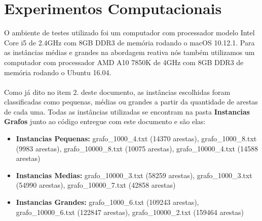 \documentclass[a4paper, 12pt]{article}
\begin{document}
\section{Experimentos Computacionais}

O ambiente de testes utilizado foi um computador com processador modelo Intel Core i5 de 2.4GHz com 8GB DDR3 de memória rodando o macOS 10.12.1. Para as instâncias médias e grandes na abordagem reativa nós também utilizamos um computador
com processador AMD A10 7850K de 4GHz com 8GB DDR3 de memória rodando o Ubuntu 16.04.
\\ \\ \indent Como já dito no item 2. deste documento, as instâncias escolhidas foram classificadas como pequenas, médias ou grandes
a partir da quantidade de arestas de cada uma. Todas as instâncias utilizadas se encontram na pasta \textbf{Instancias Grafos} junto ao código entregue com este documento e são elas:

\begin{itemize}
  \item \textbf{Instancias Pequenas:} grafo\_1000\_4.txt (14370 arestas), grafo\_1000\_8.txt (9983 arestas), grafo\_10000\_8.txt (10075 arestas), grafo\_10000\_4.txt (14588 arestas)
  \item \textbf{Instancias Medias:} grafo\_10000\_3.txt (58259 arestas), grafo\_1000\_3.txt (54990 arestas), grafo\_10000\_7.txt (42858 arestas)
  \item \textbf{Instancias Grandes:} grafo\_1000\_6.txt (109243 arestas), grafo\_10000\_6.txt (122847 arestas), grafo\_10000\_2.txt (159464 arestas)
\end{itemize}
\end{document}
